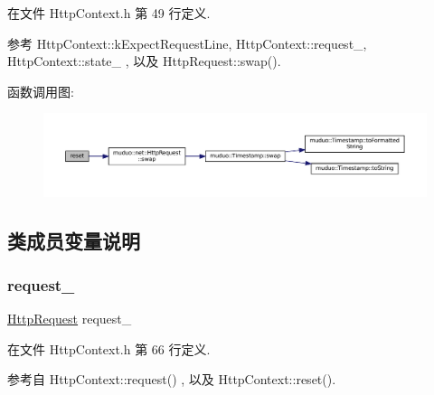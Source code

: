 在文件 Http\+Context.\+h 第 49 行定义.



参考 Http\+Context\+::k\+Expect\+Request\+Line, Http\+Context\+::request\+\_\+, Http\+Context\+::state\+\_\+ , 以及 Http\+Request\+::swap().

函数调用图\+:
\nopagebreak
\begin{figure}[H]
\begin{center}
\leavevmode
\includegraphics[width=350pt]{classmuduo_1_1net_1_1HttpContext_ad20897c5c8bd47f5d4005989bead0e55_cgraph}
\end{center}
\end{figure}


\subsection{类成员变量说明}
\mbox{\label{classmuduo_1_1net_1_1HttpContext_a6e50d2148d29c744bd4cafc005252a3b}} 
\subsubsection{\texorpdfstring{request\+\_\+}{request\_}}
{\footnotesize\ttfamily \hyperlink{classmuduo_1_1net_1_1HttpRequest}{Http\+Request} request\+\_\+\hspace{0.3cm}{\ttfamily [private]}}



在文件 Http\+Context.\+h 第 66 行定义.



参考自 Http\+Context\+::request() , 以及 Http\+Context\+::reset().

\mbox{\label{classmuduo_1_1net_1_1HttpContext_a3d9e7ad50008abb97efa5390abb349d0}} 

